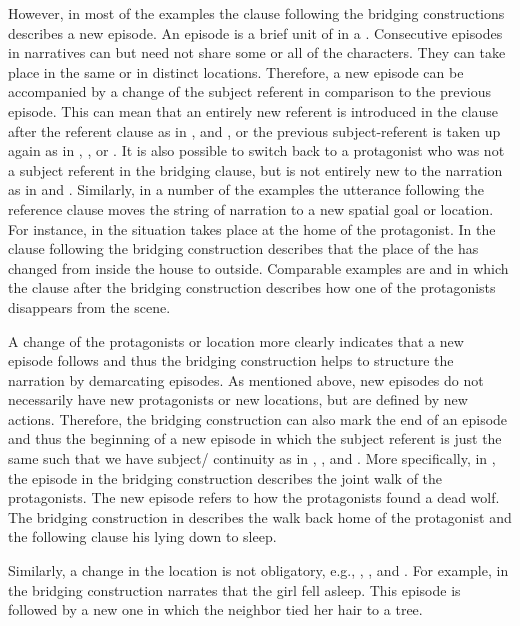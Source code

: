 \documentclass[output=paper]{LSP/langsci}
\begin{document}
However, in most of the examples the clause following the bridging constructions describes a new episode. An episode is a brief unit of  in a . Consecutive episodes in narratives can but need not share some or all of the characters. They can take place in the same or in distinct locations. Therefore, a new episode can be accompanied by a change of the subject referent in comparison to the previous episode. This can mean that an entirely new referent is introduced in the clause after the referent clause as in ,  and , or the previous subject-referent is taken up again as in , , or . It is also possible to switch back to a protagonist who was not a subject referent in the bridging clause, but is not entirely new to the narration as in  and .
Similarly, in a number of the examples the utterance following the reference clause moves the string of narration to a new spatial goal or location. For instance, in  the situation takes place at the home of the protagonist. In  the clause following the bridging construction describes that the place of the  has changed from inside the house to outside. Comparable examples are  and  in which the clause after the bridging construction describes how one of the protagonists disappears from the scene.

A change of the protagonists or location more clearly indicates that a new episode follows and thus the bridging construction helps to structure the narration by demarcating episodes. As mentioned above, new episodes do not necessarily have new protagonists or new locations, but are defined by new actions. Therefore, the bridging construction can also mark the end of an episode and thus the beginning of a new episode in which the subject referent is just the same such that we have subject/ continuity as in , , and . More specifically, in , the episode in the bridging construction describes the joint walk of the protagonists. The new episode refers to how the protagonists found a dead wolf. The bridging construction in  describes the walk back home of the protagonist and the following clause his lying down to sleep.

Similarly, a change in the location is not obligatory, e.g., , , and . For example, in  the bridging construction narrates that the girl fell asleep. This episode is followed by a new one in which the neighbor tied her hair to a tree.
\end{document}
